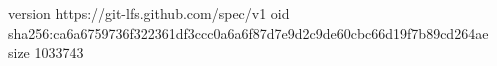 version https://git-lfs.github.com/spec/v1
oid sha256:ca6a6759736f322361df3ccc0a6a6f87d7e9d2c9de60cbc66d19f7b89cd264ae
size 1033743
